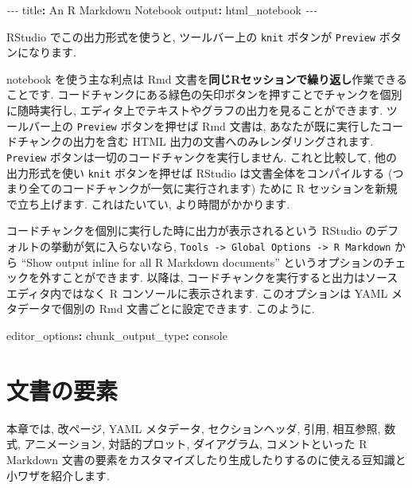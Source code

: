 \documentclass[
  11pt,
]{bxjsreport}
\newenvironment{Shaded}{\begin{snugshade}}{\end{snugshade}}
\newcommand{\AttributeTok}[1]{\textcolor[rgb]{0.77,0.63,0.00}{#1}}
\newcommand{\FunctionTok}[1]{\textcolor[rgb]{0.00,0.00,0.00}{#1}}
\newcommand{\KeywordTok}[1]{\textcolor[rgb]{0.13,0.29,0.53}{\textbf{#1}}}
\newcommand{\PreprocessorTok}[1]{\textcolor[rgb]{0.56,0.35,0.01}{\textit{#1}}}
\begin{document}
\begin{Shaded}
\begin{Highlighting}[]
\PreprocessorTok{{-}{-}{-}}
\FunctionTok{title}\KeywordTok{:}\AttributeTok{ An R Markdown Notebook}
\FunctionTok{output}\KeywordTok{:}\AttributeTok{ html\_notebook}
\PreprocessorTok{{-}{-}{-}}
\end{Highlighting}
\end{Shaded}

RStudio でこの出力形式を使うと, ツールバー上の \texttt{knit} ボタンが \texttt{Preview} ボタンになります.

notebook を使う主な利点は Rmd 文書を\textbf{同じRセッションで繰り返し}作業できることです. コードチャンクにある緑色の矢印ボタンを押すことでチャンクを個別に随時実行し, エディタ上でテキストやグラフの出力を見ることができます. ツールバー上の \texttt{Preview} ボタンを押せば Rmd 文書は, あなたが既に実行したコードチャンクの出力を含む HTML 出力の文書へのみレンダリングされます. \texttt{Preview} ボタンは一切のコードチャンクを実行しません. これと比較して, 他の出力形式を使い \texttt{knit} ボタンを押せば RStudio は文書全体をコンパイルする (つまり全てのコードチャンクが一気に実行されます) ために R セッションを新規で立ち上げます. これはたいてい, より時間がかかります.

コードチャンクを個別に実行した時に出力が表示されるという RStudio のデフォルトの挙動が気に入らないなら, \texttt{Tools -\textgreater{}\ Global\ Options\ -\textgreater{}\ R\ Markdown} から ``Show output inline for all R Markdown documents'' というオプションのチェックを外すことができます. 以降は, コードチャンクを実行すると出力はソースエディタ内ではなく R コンソールに表示されます. このオプションは YAML メタデータで個別の Rmd 文書ごとに設定できます. このように.

\begin{Shaded}
\begin{Highlighting}[]
\FunctionTok{editor\_options}\KeywordTok{:}
\AttributeTok{  }\FunctionTok{chunk\_output\_type}\KeywordTok{:}\AttributeTok{ console}
\end{Highlighting}
\end{Shaded}

\hypertarget{document-elements}{%
\chapter{文書の要素}\label{document-elements}}

本章では, 改ページ, YAML メタデータ, セクションヘッダ, 引用, 相互参照, 数式, アニメーション, 対話的プロット, ダイアグラム, コメントといった R Markdown 文書の要素をカスタマイズしたり生成したりするのに使える豆知識と小ワザを紹介します.
\end{document}
